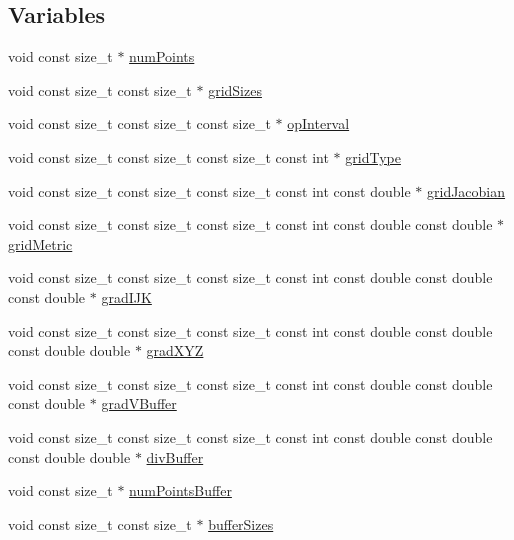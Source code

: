 \subsection*{Variables}
\begin{DoxyCompactItemize}
\item 
void const size\+\_\+t $\ast$ \hyperlink{MetricKernels_8H_ab847e17018c49a895984dc0c0ce0c2c9}{num\+Points}
\item 
void const size\+\_\+t const size\+\_\+t $\ast$ \hyperlink{MetricKernels_8H_a25bd939310952328c7c4d614148b0d63}{grid\+Sizes}
\item 
void const size\+\_\+t const size\+\_\+t const size\+\_\+t $\ast$ \hyperlink{MetricKernels_8H_ad3376da8cc0376fa774bdc40b28a61ca}{op\+Interval}
\item 
void const size\+\_\+t const size\+\_\+t const size\+\_\+t const int $\ast$ \hyperlink{MetricKernels_8H_a124af8cd8a3a1ae247f47d3e526ae4c5}{grid\+Type}
\item 
void const size\+\_\+t const size\+\_\+t const size\+\_\+t const int const double $\ast$ \hyperlink{MetricKernels_8H_a3a6e775161b1fcb46948572207773765}{grid\+Jacobian}
\item 
void const size\+\_\+t const size\+\_\+t const size\+\_\+t const int const double const double $\ast$ \hyperlink{MetricKernels_8H_a1bb228c762eec1a00302214e00b38fdc}{grid\+Metric}
\item 
void const size\+\_\+t const size\+\_\+t const size\+\_\+t const int const double const double const double $\ast$ \hyperlink{MetricKernels_8H_ad58f505f7d2d54962e14d93a8b3a2104}{grad\+I\+JK}
\item 
void const size\+\_\+t const size\+\_\+t const size\+\_\+t const int const double const double const double double $\ast$ \hyperlink{MetricKernels_8H_a88d2da27b44f006b58b7cebd40406d58}{grad\+X\+YZ}
\item 
void const size\+\_\+t const size\+\_\+t const size\+\_\+t const int const double const double const double $\ast$ \hyperlink{MetricKernels_8H_a2b1827ebabaeeb58a5d4c7a8fe729bca}{grad\+V\+Buffer}
\item 
void const size\+\_\+t const size\+\_\+t const size\+\_\+t const int const double const double const double double $\ast$ \hyperlink{MetricKernels_8H_ae5c340d8d4218077e9f63a96aa442d93}{div\+Buffer}
\item 
void const size\+\_\+t $\ast$ \hyperlink{MetricKernels_8H_a091c49fcdc8b19150902448c3c284be2}{num\+Points\+Buffer}
\item 
void const size\+\_\+t const size\+\_\+t $\ast$ \hyperlink{MetricKernels_8H_af0ac147fcc3cf0ebf0ce192160b920b2}{buffer\+Sizes}

\end{DoxyCompactItemize}
